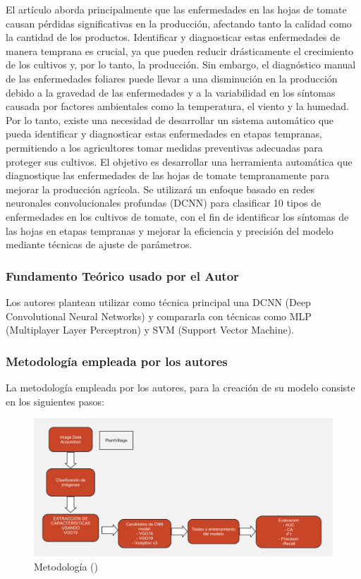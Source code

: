 El artículo aborda principalmente que las enfermedades en las hojas de tomate causan pérdidas significativas en la producción, afectando tanto la calidad como la cantidad de los productos. Identificar y diagnosticar estas enfermedades de manera temprana es crucial, ya que pueden reducir drásticamente el crecimiento de los cultivos y, por lo tanto, la producción. Sin embargo, el diagnóstico manual de las enfermedades foliares puede llevar a una disminución en la producción debido a la gravedad de las enfermedades y a la variabilidad en los síntomas causada por factores ambientales como la temperatura, el viento y la humedad. Por lo tanto, existe una necesidad de desarrollar un sistema automático que pueda identificar y diagnosticar estas enfermedades en etapas tempranas, permitiendo a los agricultores tomar medidas preventivas adecuadas para proteger sus cultivos. El objetivo es desarrollar una herramienta automática que diagnostique las enfermedades de las hojas de tomate tempranamente para mejorar la producción agrícola. Se utilizará un enfoque basado en redes neuronales convolucionales profundas (DCNN) para clasificar 10 tipos de enfermedades en los cultivos de tomate, con el fin de identificar los síntomas de las hojas en etapas tempranas y mejorar la eficiencia y precisión del modelo mediante técnicas de ajuste de parámetros.

\subsubsection{Fundamento Teórico usado por el Autor}

Los autores plantean utilizar como técnica principal una DCNN (Deep Convolutional Neural Networks) y compararla con técnicas como MLP (Multiplayer Layer Perceptron) y SVM (Support Vector Machine).

\subsubsection{Metodología empleada por los autores}
La metodología empleada por los autores, para la creación de su modelo consiste en los siguientes pasos: 

\begin{figure}[H]
	\begin{center}
		\includegraphics[width=1\textwidth]{2/figures/ant7.jpg}
		\caption{Metodología (\cite{antecedente7})}
	\end{center}
\end{figure}

